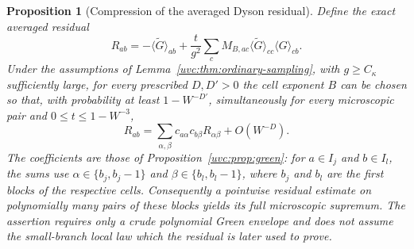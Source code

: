 \documentclass[11pt]{article}
\numberwithin{equation}{section}
\newtheorem{proposition}[theorem]{Proposition}
\theoremstyle{remark}
\newcommand{\wt}{\widetilde}
\begin{document}
\begin{proposition}[Compression of the averaged Dyson residual]
\label{uvc:prop:residual-compression}
Define the exact averaged residual
\[
 R_{ab}=-\langle\wt G\rangle_{ab}
       +\frac t{g^2}\sum_cM_{B,ac}\langle\wt G\rangle_{cc}\langle G\rangle_{cb}.
\]
Under the assumptions of Lemma~\ref{uvc:thm:ordinary-sampling},
with $g\ge C_\kappa$ sufficiently large, for every
prescribed $D,D'>0$ the cell exponent $B$ can be chosen so that, with
probability at least $1-W^{-D'}$, simultaneously for every microscopic pair
and $0\le t\le1-W^{-3}$,
\[
 R_{ab}=\sum_{\alpha,\beta}c_{a\alpha}c_{b\beta}R_{\alpha\beta}
                   +O(W^{-D}).
\]
The coefficients are those of Proposition~\ref{uvc:prop:green}: for
$a\in I_j$ and $b\in I_l$, the sums use $\alpha\in\{b_j,b_j-1\}$ and
$\beta\in\{b_l,b_l-1\}$, where $b_j$ and $b_l$ are the first blocks of
the respective cells.
Consequently a pointwise residual estimate on polynomially many
pairs of these blocks yields its full microscopic supremum. The assertion
requires only a crude polynomial Green envelope and does not assume
the small-branch local law which the residual is later used to prove.
\end{proposition}
\end{document}
